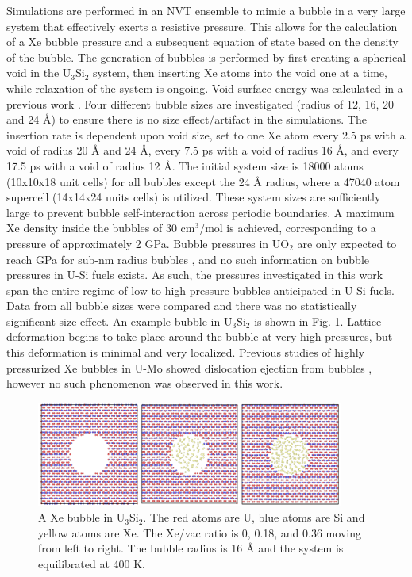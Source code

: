 \documentclass[review]{elsarticle}
\begin{document}
Simulations are performed in an NVT ensemble to mimic a bubble in a very large system that effectively exerts a resistive pressure. This allows for the calculation of a Xe bubble pressure and a subsequent equation of state based on the density of the bubble. The generation of bubbles is performed by first creating a spherical void in the U$_3$Si$_2$ system, then inserting Xe atoms into the void one at a time, while relaxation of the system is ongoing. Void surface energy was calculated in a previous work \cite{beeler_usi_gb}. Four different bubble sizes are investigated (radius of 12, 16, 20 and 24 {\AA}) to ensure there is no size effect/artifact in the simulations. The insertion rate is dependent upon void size, set to one Xe atom every 2.5 ps with a void of radius 20 {\AA} and 24 {\AA}, every 7.5 ps with a void of radius 16 {\AA}, and every 17.5 ps with a void of radius 12 {\AA}. The initial system size is 18000 atoms (10x10x18 unit cells) for all bubbles except the 24 {\AA} radius, where a 47040 atom supercell (14x14x24 units cells) is utilized. These system sizes are sufficiently large to prevent bubble self-interaction across periodic boundaries. A maximum Xe density inside the bubbles of 30 cm$^3$/mol is achieved, corresponding to a pressure of approximately 2 GPa. Bubble pressures in UO$_2$ are only expected to reach GPa for sub-nm radius bubbles \cite{une2002, nogita1998}, and no such information on bubble pressures in U-Si fuels exists. As such, the pressures investigated in this work span the entire regime of low to high pressure bubbles anticipated in U-Si fuels. Data from all bubble sizes were compared and there was no statistically significant size effect. An example bubble in U$_3$Si$_2$ is shown in Fig. \ref{fig:bub}. Lattice deformation begins to take place around the bubble at very high pressures, but this deformation is minimal and very localized. Previous studies of highly pressurized Xe bubbles in U-Mo showed dislocation ejection from bubbles \cite{hu2017}, however no such phenomenon was observed in this work. 

\begin{figure}[hbt]
	\centering
	\includegraphics[width=0.9\textwidth]{bub_ex4.png}
 \caption{A Xe bubble in U$_3$Si$_2$. The red atoms are U, blue atoms are Si and yellow atoms are Xe. The Xe/vac ratio is 0, 0.18, and 0.36 moving from left to right. The bubble radius is 16 {\AA} and the system is equilibrated at 400 K.}\label{fig:bub}
\end{figure}
\end{document}
